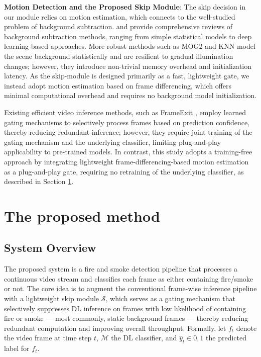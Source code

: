 \documentclass[
  10pt,
]{article}
\begin{document}
\textbf{Motion Detection and the Proposed Skip Module}: The skip
decision in our module relies on motion estimation, which connects to
the well-studied problem of background subtraction.
 and
 provide comprehensive
reviews of background subtraction methods, ranging from simple
statistical models to deep learning-based approaches. More robust
methods such as MOG2 and KNN
 model the scene
background statistically and are resilient to gradual illumination
changes; however, they introduce non-trivial memory overhead and
initialization latency. As the skip-module is designed primarily as a
fast, lightweight gate, we instead adopt motion estimation based on
frame differencing, which offers minimal computational overhead and
requires no background model initialization.

Existing efficient video inference methods, such as FrameExit
, employ learned gating
mechanisms to selectively process frames based on prediction confidence,
thereby reducing redundant inference; however, they require joint
training of the gating mechanism and the underlying classifier, limiting
plug-and-play applicability to pre-trained models. In contrast, this
study adopts a training-free approach by integrating lightweight
frame-differencing-based motion estimation as a plug-and-play gate,
requiring no retraining of the underlying classifier, as described in
Section \ref{sec:method}.

\section{The proposed method}\label{sec:method}

\subsection{System Overview}\label{system-overview}



The proposed system is a fire and smoke detection pipeline that
processes a continuous video stream and classifies each frame as either
containing fire/smoke or not. The core idea is to augment the
conventional frame-wise inference pipeline with a lightweight skip
module \(\mathcal{S}\), which serves as a gating mechanism that
selectively suppresses DL inference on frames with low likelihood of
containing fire or smoke --- most commonly, static background frames ---
thereby reducing redundant computation and improving overall throughput.
Formally, let \(f_t\) denote the video frame at time step \(t\),
\(\mathcal{M}\) the DL classifier, and \(\hat{y}_t \in {0, 1}\) the
predicted label for \(f_t\).
\end{document}
